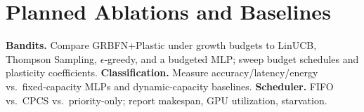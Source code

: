 \documentclass[
]{article}
\begin{document}
\section*{Planned Ablations and Baselines}
\textbf{Bandits.} Compare GRBFN+Plastic under growth budgets to LinUCB, Thompson Sampling, $\epsilon$‑greedy, and a budgeted MLP; sweep budget schedules and plasticity coefficients. \textbf{Classification.} Measure accuracy/latency/energy vs.\ fixed‑capacity MLPs and dynamic‑capacity baselines. \textbf{Scheduler.} FIFO vs.\ CPCS vs.\ priority‑only; report makespan, GPU utilization, starvation.

\end{document}
